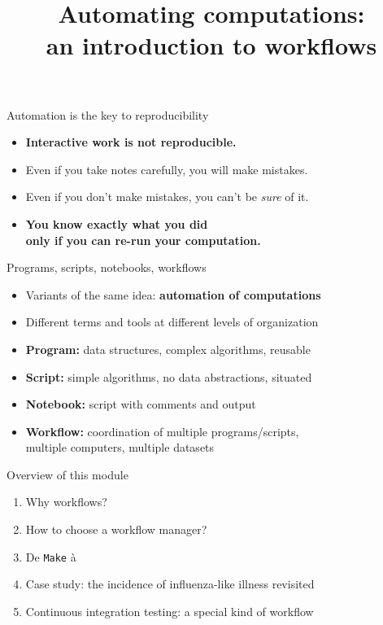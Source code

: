 \documentclass[aspectratio=169]{beamer}
\title{Automating computations:\\ an introduction to workflows}
\date{}
\begin{document}
\begin{frame}
\titlepage
\end{frame}

\begin{frame}{Automation is the key to reproducibility}

  \begin{itemize}
  \item \textbf{Interactive work is not reproducible.}
  \item Even if you take notes carefully, you will make mistakes.
  \item Even if you don't make mistakes, you can't be \textit{sure} of it.
  \item \textbf{You know exactly what you did \\ only if you can re-run your computation.}
  \end{itemize}

\end{frame}

\begin{frame}{Programs, scripts, notebooks, workflows}

  \begin{itemize}
  \item Variants of the same idea: \textbf{automation of computations}
  \item Different terms and tools at different levels of organization
  \item \textbf{Program:} data structures, complex algorithms, reusable
  \item \textbf{Script:} simple algorithms, no data abstractions, situated
  \item \textbf{Notebook:} script with comments and output
  \item \textbf{Workflow:} coordination of multiple programs/scripts, \\
                           multiple computers, multiple datasets
  \end{itemize}

\end{frame}

\begin{frame}{Overview of this module}

  \begin{enumerate}
  \item Why workflows?
  \item How to choose a workflow manager?
  \item De \texttt{Make} à 
  \item Case study: the incidence of influenza-like illness revisited
  \item Continuous integration testing: a special kind of workflow
  \end{enumerate}

\end{frame}
\end{document}
